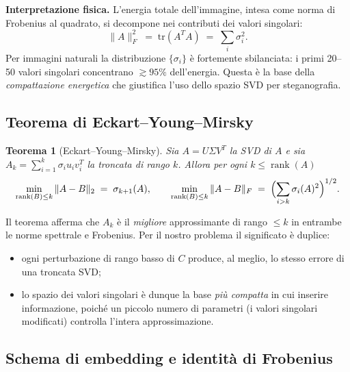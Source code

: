 \documentclass[11pt,a4paper]{article}
\newtheorem{theorem}{Teorema}
\theoremstyle{definition}
\theoremstyle{remark}
\DeclareMathOperator{\rank}{rank}
\begin{document}
\noindent\textbf{Interpretazione fisica.}  L'energia totale
dell'immagine, intesa come norma di Frobenius al quadrato, si decompone
nei contributi dei valori singolari:
\[
  \|A\|_F^2 \;=\; \mathrm{tr}(A^T A) \;=\; \sum_{i} \sigma_i^2.
\]
Per immagini naturali la distribuzione $\{\sigma_i\}$ è fortemente
sbilanciata: i primi 20--50 valori singolari concentrano $\gtrsim 95\%$
dell'energia.  Questa è la base della \emph{compattazione energetica}
che giustifica l'uso dello spazio SVD per steganografia.

\subsection{Teorema di Eckart--Young--Mirsky}
\label{sec:eym}

\begin{theorem}[Eckart--Young--Mirsky]\label{thm:eym}
Sia $A = U\Sigma V^T$ la SVD di $A$ e sia
$A_k = \sum_{i=1}^{k} \sigma_i u_i v_i^T$ la troncata di rango $k$.
Allora per ogni $k \leq \rank(A)$
\begin{equation}\label{eq:eym}
  \min_{\rank(B)\leq k} \|A - B\|_2 \;=\; \sigma_{k+1}(A),
  \qquad
  \min_{\rank(B)\leq k} \|A - B\|_F \;=\; \Bigl(\sum_{i>k}\sigma_i(A)^2\Bigr)^{1/2}.
\end{equation}
\end{theorem}

\noindent
Il teorema afferma che $A_k$ è il \emph{migliore} approssimante di
rango $\leq k$ in entrambe le norme spettrale e Frobenius.  Per il
nostro problema il significato è duplice:

\begin{itemize}[leftmargin=*,itemsep=2pt]
  \item ogni perturbazione di rango basso di $C$ produce, al meglio, lo
        stesso errore di una troncata SVD;
  \item lo spazio dei valori singolari è dunque la base \emph{più
        compatta} in cui inserire informazione, poiché un piccolo numero
        di parametri (i valori singolari modificati) controlla
        l'intera approssimazione.
\end{itemize}

\subsection{Schema di embedding e identità di Frobenius}
\label{sec:embedding}
\end{document}
